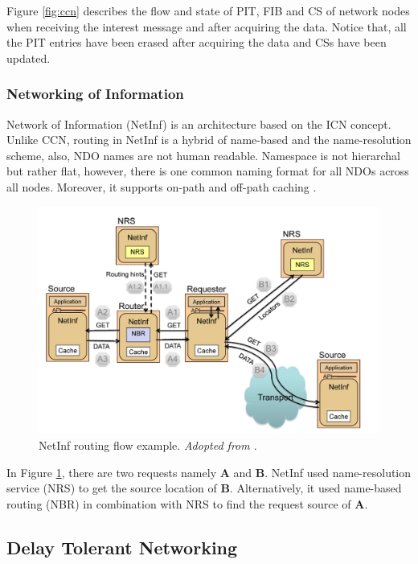 \noindent Figure \ref{fig:ccn} describes the flow and state of PIT, FIB and CS of network nodes when receiving the interest message and after acquiring the data. Notice that, all the PIT entries have been erased after acquiring the data and CSs have been updated.


\subsubsection{Networking of Information }
Network of Information (NetInf) is an architecture based on the ICN concept. Unlike CCN, routing in NetInf is a hybrid of name-based  and the name-resolution scheme, also, NDO names are not human readable. Namespace is not hierarchal but rather flat, however, there is one common naming format for all NDOs across all nodes. Moreover, it supports on-path and off-path caching \cite{Dannewitz:2013:NII:2459510.2459643}.

\begin{figure}[H]
	\centering
	\includegraphics[scale=0.4]{images/netinf.png}
	\caption{NetInf routing flow example. \textit{Adopted from \cite{Dannewitz:2013:NII:2459510.2459643}}.}
	\label{fig:netinf}
\end{figure}


 \noindent In Figure \ref{fig:netinf}, there are two requests namely \textbf{A} and \textbf{B}.  NetInf used name-resolution service (NRS) to get the source location of \textbf{B}. Alternatively, it used name-based routing (NBR) in combination with NRS to find the request source of \textbf{A}.




\subsection{Delay Tolerant Networking}

